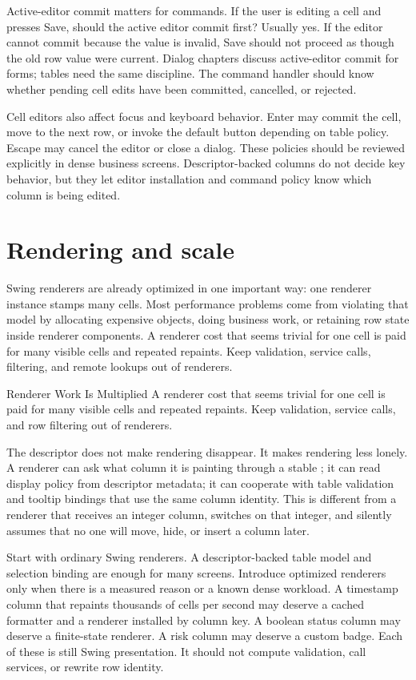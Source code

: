 Active-editor commit matters for commands. If the user is editing a cell and
presses Save, should the active editor commit first? Usually yes. If the
editor cannot commit because the value is invalid, Save should not proceed as
though the old row value were current. Dialog chapters discuss active-editor
commit for forms; tables need the same discipline. The command handler should
know whether pending cell edits have been committed, cancelled, or rejected.

Cell editors also affect focus and keyboard behavior. Enter may commit the
cell, move to the next row, or invoke the default button depending on table
policy. Escape may cancel the editor or close a dialog. These policies should
be reviewed explicitly in dense business screens. Descriptor-backed columns
do not decide key behavior, but they let editor installation and command
policy know which column is being edited.

\section{Rendering and scale}

Swing renderers are already optimized in one important way: one renderer
instance stamps many cells. Most performance problems come from violating that
model by allocating expensive objects, doing business work, or retaining row
state inside renderer components. A renderer cost that seems trivial for one
cell is paid for many visible cells and repeated repaints. Keep validation,
service calls, filtering, and remote lookups out of renderers.

\begin{pitfallbox}{Renderer Work Is Multiplied}
A renderer cost that seems trivial for one cell is paid for many visible cells
and repeated repaints. Keep validation, service calls, and row filtering out
of renderers.
\end{pitfallbox}

The descriptor does not make rendering disappear. It makes rendering less
lonely. A renderer can ask what column it is painting through a stable
; it can read display policy from descriptor metadata; it can
cooperate with table validation and tooltip bindings that use the same column
identity. This is different from a renderer that receives an integer column,
switches on that integer, and silently assumes that no one will move, hide, or
insert a column later.

Start with ordinary Swing renderers. A descriptor-backed table model and
selection binding are enough for many screens. Introduce optimized renderers
only when there is a measured reason or a known dense workload. A timestamp
column that repaints thousands of cells per second may deserve a cached
formatter and a renderer installed by column key. A boolean status column may
deserve a finite-state renderer. A risk column may deserve a custom badge.
Each of these is still Swing presentation. It should not compute validation,
call services, or rewrite row identity.

